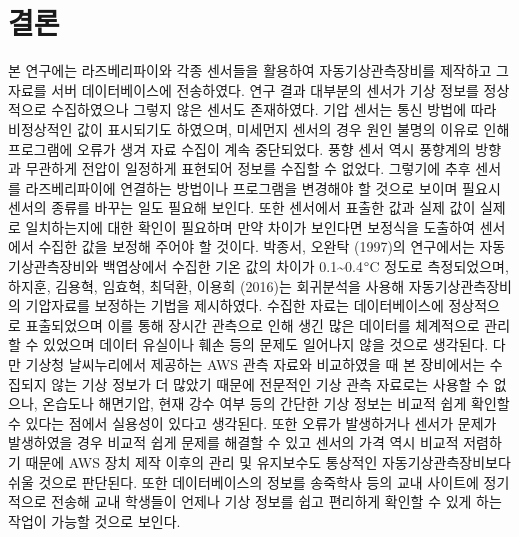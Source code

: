 \section{결론}

본 연구에는 라즈베리파이와 각종 센서들을 활용하여 자동기상관측장비를 제작하고 그 자료를 서버 데이터베이스에 전송하였다. 연구 결과 대부분의 센서가 기상 정보를 정상적으로 수집하였으나 그렇지 않은 센서도 존재하였다. 기압 센서는 통신 방법에 따라 비정상적인 값이 표시되기도 하였으며, 미세먼지 센서의 경우 원인 불명의 이유로 인해 프로그램에 오류가 생겨 자료 수집이 계속 중단되었다. 풍향 센서 역시 풍향계의 방향과 무관하게 전압이 일정하게 표현되어 정보를 수집할 수 없었다. 그렇기에 추후 센서를 라즈베리파이에 연결하는 방법이나 프로그램을 변경해야 할 것으로 보이며 필요시 센서의 종류를 바꾸는 일도 필요해 보인다. 또한 센서에서 표출한 값과 실제 값이 실제로 일치하는지에 대한 확인이 필요하며 만약 차이가 보인다면 보정식을 도출하여 센서에서 수집한 값을 보정해 주어야 할 것이다. 박종서, 오완탁 (1997)의 연구에서는 자동기상관측장비와 백엽상에서 수집한 기온 값의 차이가 0.1\~{}0.4$\degree$C 정도로 측정되었으며, 하지훈, 김용혁, 임효혁, 최덕환, 이용희 (2016)는 회귀분석을 사용해 자동기상관측장비의 기압자료를 보정하는 기법을 제시하였다.\cite{Ref3}\cite{Ref4} 수집한 자료는 데이터베이스에 정상적으로 표출되었으며 이를 통해 장시간 관측으로 인해 생긴 많은 데이터를 체계적으로 관리할 수 있었으며 데이터 유실이나 훼손 등의 문제도 일어나지 않을 것으로 생각된다. 다만 기상청 날씨누리에서 제공하는 AWS 관측 자료와 비교하였을 때 본 장비에서는 수집되지 않는 기상 정보가 더 많았기 때문에 전문적인 기상 관측 자료로는 사용할 수 없으나, 온습도나 해면기압, 현재 강수 여부 등의 간단한 기상 정보는 비교적 쉽게 확인할 수 있다는 점에서 실용성이 있다고 생각된다. 또한 오류가 발생하거나 센서가 문제가 발생하였을 경우 비교적 쉽게 문제를 해결할 수 있고 센서의 가격 역시 비교적 저렴하기 때문에 AWS 장치 제작 이후의 관리 및 유지보수도 통상적인 자동기상관측장비보다 쉬울 것으로 판단된다. 또한 데이터베이스의 정보를 송죽학사 등의 교내 사이트에 정기적으로 전송해 교내 학생들이 언제나 기상 정보를 쉽고 편리하게 확인할 수 있게 하는 작업이 가능할 것으로 보인다.